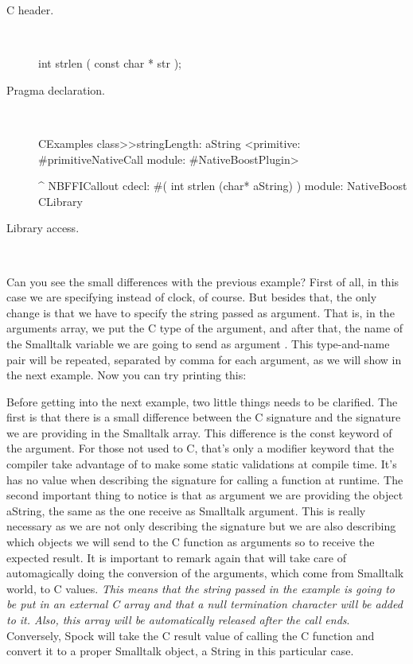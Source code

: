 \documentclass[a4paper,10pt,twoside]{book}
\begin{document}
\begin{description}
\item [C header.] \ 

\begin{code}{}
int strlen ( const char * str );
\end{code}

\item [Pragma declaration.] \ 

\begin{code}{}
CExamples class>>stringLength: aString
	<primitive: #primitiveNativeCall module: #NativeBoostPlugin>
	
	^ NBFFICallout cdecl: #( int strlen (char* aString) ) module: NativeBoost CLibrary
\end{code}


\item [Library access.] \ 
 

\end{description}


Can you see the small differences with the previous example? 
First of all, in this case we are specifying 
instead of clock, of course. But besides that, the only
change is that we have to specify the string passed
as argument. That is, in the arguments array, we
put the C type of the argument, and after that,
the name of the Smalltalk variable we are going to send as 
argument . This type-and-name pair will be repeated, separated 
by comma for each argument, as we will show in the next
example. Now you can try printing this:


Before getting into the next example, two little things
needs to be clarified. The first is that there is a small
difference between the C signature and the signature we are
providing in the Smalltalk array. This difference is 
the const keyword of the argument. For those not used to C, 
that's only a modifier keyword that the compiler take advantage
of to make some static validations at compile time. It's has no
value when describing the signature for calling a function at
runtime.
The second important thing to notice is that as argument we are providing
the object {\sffamily aString}, the same as the one receive as Smalltalk argument.
This is really necessary as we are not only describing the signature
but we are also describing which objects we will send to the C 
function as arguments so to receive the expected result.
It is important to remark again that \Spock will take care of automagically
doing the conversion of the arguments, which come from Smalltalk
world, to C values. \emph{This means
that the string passed in the example is going to be put in an
external C  array and that a null termination character will be
added to it. Also, this array will be automatically released 
after the call ends}. Conversely, Spock will take the C result
value of calling the C function and convert it to a proper Smalltalk
object, a String in this particular case.
\end{document}
